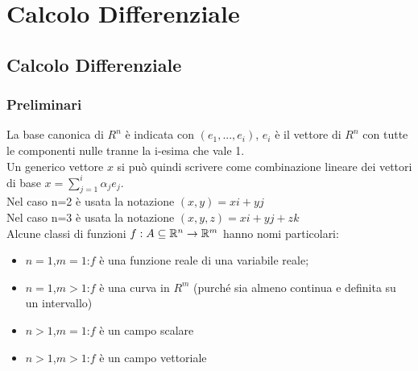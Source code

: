 \part{Calcolo Differenziale}

\chapter{Calcolo Differenziale}

\section{Preliminari}
La base canonica di $R^n$ è indicata con $(e_1,...,e_i)$, $e_i$ è il vettore di $R^n$ con tutte le componenti nulle tranne la i-esima che vale 1.\\
Un generico vettore $x$ si può quindi scrivere come combinazione lineare dei vettori di base $x=\sum\limits_{j=1}^{i}\alpha_j e_j$.\\
Nel caso n=2 è usata la notazione $(x,y)=xi+yj$\\
Nel caso n=3 è usata la notazione $(x,y,z)=xi+yj+zk$\\
Alcune classi di funzioni $f:A\subseteq\mathbb{R}^n\rightarrow\mathbb{R}^m$ hanno nomi particolari:
\begin{itemize}
	\item 
	$n=1$,$m=1$:$f$ è una funzione reale di una variabile reale;
	\item 
	$n=1$,$m>1$:$f$ è una curva in $R^m$ (purché sia almeno continua e definita su un intervallo)
	\item 
	$n>1$,$m=1$:$f$ è un campo scalare
	\item
	$n>1$,$m>1$:$f$ è un campo vettoriale
\end{itemize}
